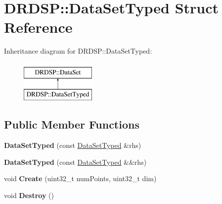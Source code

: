 \hypertarget{struct_d_r_d_s_p_1_1_data_set_typed}{\section{D\-R\-D\-S\-P\-:\-:Data\-Set\-Typed Struct Reference}
\label{struct_d_r_d_s_p_1_1_data_set_typed}
}
Inheritance diagram for D\-R\-D\-S\-P\-:\-:Data\-Set\-Typed\-:\begin{figure}[H]
\begin{center}
\leavevmode
\includegraphics[height=2.000000cm]{struct_d_r_d_s_p_1_1_data_set_typed}
\end{center}
\end{figure}
\subsection*{Public Member Functions}
\begin{DoxyCompactItemize}
\item 
\hypertarget{struct_d_r_d_s_p_1_1_data_set_typed_acb54ebaf165fd365edc9adaa05c9ae44}{{\bfseries Data\-Set\-Typed} (const \hyperlink{struct_d_r_d_s_p_1_1_data_set_typed}{Data\-Set\-Typed} \&rhs)}\label{struct_d_r_d_s_p_1_1_data_set_typed_acb54ebaf165fd365edc9adaa05c9ae44}

\item 
\hypertarget{struct_d_r_d_s_p_1_1_data_set_typed_a87f023734d2ace299859cfcc685c7797}{{\bfseries Data\-Set\-Typed} (const \hyperlink{struct_d_r_d_s_p_1_1_data_set_typed}{Data\-Set\-Typed} \&\&rhs)}\label{struct_d_r_d_s_p_1_1_data_set_typed_a87f023734d2ace299859cfcc685c7797}

\item 
\hypertarget{struct_d_r_d_s_p_1_1_data_set_typed_a57f2f8449d2390b76aa98de3dbde73ca}{void {\bfseries Create} (uint32\-\_\-t num\-Points, uint32\-\_\-t dim)}\label{struct_d_r_d_s_p_1_1_data_set_typed_a57f2f8449d2390b76aa98de3dbde73ca}

\item 
\hypertarget{struct_d_r_d_s_p_1_1_data_set_typed_ae6876dff24b83610eaed933ff2c5d8e4}{void {\bfseries Destroy} ()}\label{struct_d_r_d_s_p_1_1_data_set_typed_ae6876dff24b83610eaed933ff2c5d8e4}

\end{DoxyCompactItemize}
